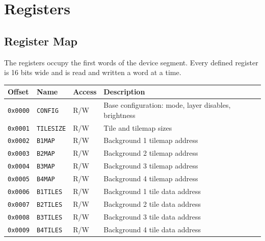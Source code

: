 \chapter{Registers}
\label{ch:registers}

\section{Register Map}

The registers occupy the first words of the device segment. Every defined register is 16 bits wide and is read and
written a word at a time.

\begin{table}[H]
	\centering
	\begin{tabular}{lllp{5.2cm}}
		\toprule
		\textbf{Offset}                  & \textbf{Name}     & \textbf{Access} & \textbf{Description}                                     \\
		\midrule
		\texttt{0x0000}                  & \texttt{CONFIG}   & R/W             & Base configuration: mode, layer disables, brightness     \\
		\texttt{0x0001}                  & \texttt{TILESIZE} & R/W             & Tile and tilemap sizes                                   \\
		\texttt{0x0002}                  & \texttt{B1MAP}    & R/W             & Background 1 tilemap address                             \\
		\texttt{0x0003}                  & \texttt{B2MAP}    & R/W             & Background 2 tilemap address                             \\
		\texttt{0x0004}                  & \texttt{B3MAP}    & R/W             & Background 3 tilemap address                             \\
		\texttt{0x0005}                  & \texttt{B4MAP}    & R/W             & Background 4 tilemap address                             \\
		\texttt{0x0006}                  & \texttt{B1TILES}  & R/W             & Background 1 tile data address                           \\
		\texttt{0x0007}                  & \texttt{B2TILES}  & R/W             & Background 2 tile data address                           \\
		\texttt{0x0008}                  & \texttt{B3TILES}  & R/W             & Background 3 tile data address                           \\
		\texttt{0x0009}                  & \texttt{B4TILES}  & R/W             & Background 4 tile data address                           \\

\end{tabular}
\end{table}
